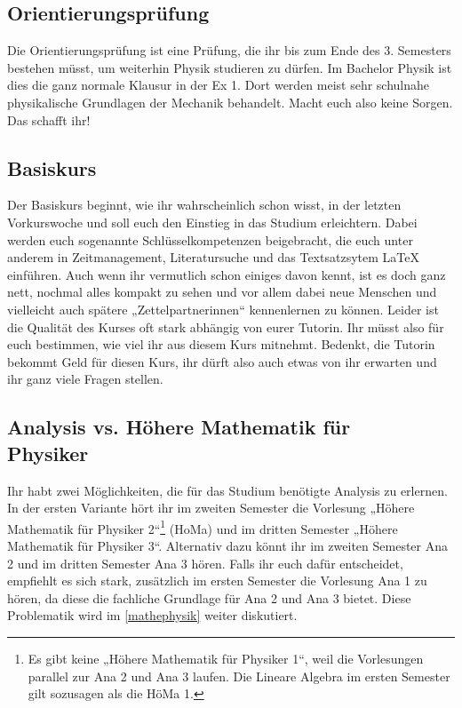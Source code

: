\subsection{Orientierungsprüfung}

Die Orientierungsprüfung ist eine Prüfung, die ihr bis zum Ende des 3. Semesters bestehen müsst, um weiterhin Physik studieren zu dürfen. Im Bachelor Physik ist dies die ganz normale Klausur in der Ex 1. Dort werden meist sehr schulnahe physikalische Grundlagen der Mechanik behandelt. Macht euch also keine Sorgen. Das schafft ihr!

\subsection{Basiskurs}

Der Basiskurs beginnt, wie ihr wahrscheinlich schon wisst, in der letzten Vorkurswoche und soll euch den Einstieg in das Studium erleichtern. Dabei werden euch sogenannte Schlüsselkompetenzen beigebracht, die euch unter anderem in Zeitmanagement, Literatursuche und das Textsatzsytem \LaTeX{} einführen. Auch wenn ihr vermutlich schon einiges davon kennt, ist es doch ganz nett, nochmal alles kompakt zu sehen und vor allem dabei neue Menschen und vielleicht auch spätere „Zettelpartnerinnen“ kennenlernen zu können. Leider ist die Qualität des Kurses oft stark abhängig von eurer Tutorin. Ihr müsst also für euch bestimmen, wie viel ihr aus diesem Kurs mitnehmt. Bedenkt, die Tutorin bekommt Geld für diesen Kurs, ihr dürft also auch etwas von ihr erwarten und ihr ganz viele Fragen stellen.

\subsection{Analysis vs. Höhere Mathematik für \\Physiker}
Ihr habt zwei Möglichkeiten, die für das Studium benötigte Analysis zu erlernen.
In der ersten Variante hört ihr im zweiten Semester die Vorlesung „Höhere Mathematik für Physiker 2“\footnote{Es gibt keine „Höhere Mathematik für Physiker 1“, weil die Vorlesungen parallel zur Ana 2 und Ana 3 laufen. Die Lineare Algebra im ersten Semester gilt sozusagen als die HöMa 1.} (\gls{HoMa}) und im dritten Semester „Höhere Mathematik für Physiker 3“. Alternativ dazu könnt ihr im zweiten Semester Ana 2 und im dritten Semester Ana 3 hören. Falls ihr euch dafür entscheidet, empfiehlt es sich stark, zusätzlich im ersten Semester die Vorlesung Ana 1 zu hören, da diese die fachliche Grundlage für Ana 2 und Ana 3 bietet. Diese Problematik wird im \autoref{mathephysik} weiter diskutiert.

